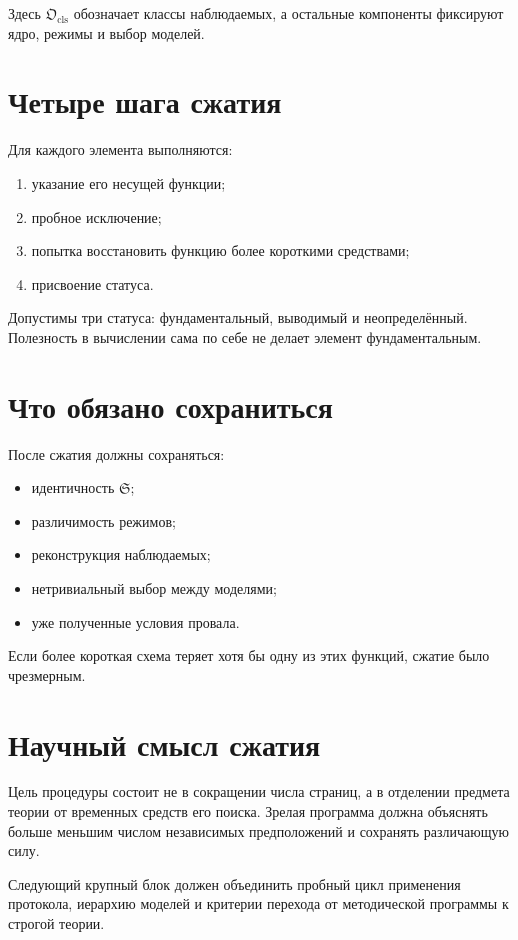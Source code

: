 Здесь $\mathfrak O_{\mathrm{cls}}$ обозначает классы наблюдаемых, а остальные
компоненты фиксируют ядро, режимы и выбор моделей.

\section{Четыре шага сжатия}

Для каждого элемента выполняются:
\begin{enumerate}
 \item указание его несущей функции;
 \item пробное исключение;
 \item попытка восстановить функцию более короткими средствами;
 \item присвоение статуса.
\end{enumerate}

Допустимы три статуса: фундаментальный, выводимый и неопределённый. Полезность
в вычислении сама по себе не делает элемент фундаментальным.

\section{Что обязано сохраниться}

После сжатия должны сохраняться:
\begin{itemize}
 \item идентичность $\mathfrak S$;
 \item различимость режимов;
 \item реконструкция наблюдаемых;
 \item нетривиальный выбор между моделями;
 \item уже полученные условия провала.
\end{itemize}

Если более короткая схема теряет хотя бы одну из этих функций, сжатие было
чрезмерным.

\section{Научный смысл сжатия}

Цель процедуры состоит не в сокращении числа страниц, а в отделении предмета
теории от временных средств его поиска. Зрелая программа должна объяснять
больше меньшим числом независимых предположений и сохранять различающую силу.

Следующий крупный блок должен объединить пробный цикл применения протокола,
иерархию моделей и критерии перехода от методической программы к строгой
теории.